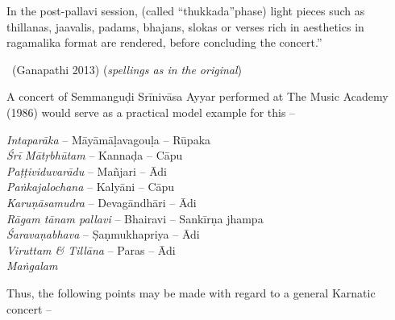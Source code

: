 \begin{myquote}
In the post-pallavi session, (called “thukkada”phase) light pieces such as thillanas, jaavalis, padams, bhajans, slokas or verses rich in aesthetics in ragamalika format are rendered, before concluding the concert.” 

~\hfill (Ganapathi 2013) (\textit{spellings as in the original})
\end{myquote}

A concert of Semmanguḍi Srīnivāsa Ayyar performed at The Music Academy (1986) would serve as a practical model example for this –

\textit{Intaparāka} – Māyāmāḷavagouḷa – Rūpaka\\\textit{Śrī Mātṛbhūtam} – Kannaḍa – Cāpu\\\textit{Paṭṭividuvarādu} – Mañjari – Ādi\\\textit{Paṅkajalochana} – Kalyāni – Cāpu\\\textit{Karuṇāsamudra} – Devagāndhāri – Ādi\\\textit{Rāgam tānam pallavi} – Bhairavi – Sankīrṇa jhampa\\\textit{Śaravaṇabhava} – Ṣaṇmukhapriya – Ādi\\\textit{Viruttam \& Tillāna} – Paras – Ādi \\\textit{Maṅgalam}

Thus, the following points may be made with regard to a general Karnatic concert –

